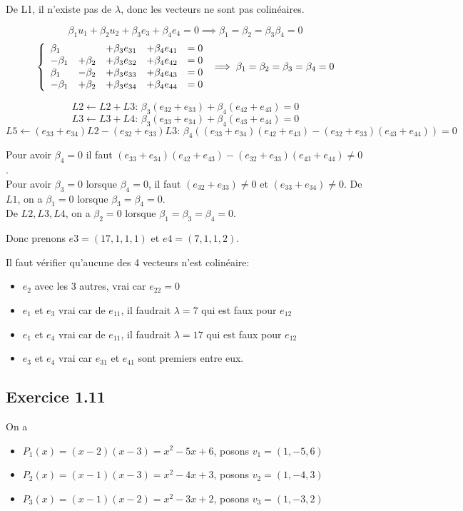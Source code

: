 \documentclass[]{book}
\theoremstyle{definition}
\begin{document}
De L1, il n'existe pas de $\lambda$, donc les vecteurs ne sont pas colin\'eaires.

$$
\beta_1 u_{1} +\beta_2 u_{2} + \beta_3 e_{3} + \beta_4 e_{4} = 0
\implies
\beta_1=\beta_2=\beta_3\beta_4=0
$$
$$
\left\{ 
\begin{array}{l l l l l}
  \beta_1  &          & +\beta_3 e_{31} & +\beta_4 e_{41} & = 0 \\
  -\beta_1 & +\beta_2 & +\beta_3 e_{32} & +\beta_4 e_{42} & = 0 \\
  \beta_1  & -\beta_2 & +\beta_3 e_{33} & +\beta_4 e_{43} & = 0 \\
  -\beta_1 & +\beta_2 & +\beta_3 e_{34} & +\beta_4 e_{44} & = 0 \\
\end{array}
\right. 
\implies
\beta_1=\beta_2=\beta_3=\beta_4=0
$$

$$L2 \leftarrow L2+L3:\, \beta_3(e_{32}+e_{33}) + \beta_4(e_{42}+e_{43}) = 0$$
$$L3 \leftarrow L3+L4:\, \beta_3(e_{33}+e_{34}) + \beta_4(e_{43}+e_{44}) = 0$$
$$L5 \leftarrow (e_{33}+e_{34})L2 - (e_{32}+e_{33})L3:\, \beta_4 ((e_{33}+e_{34})(e_{42}+e_{43}) - (e_{32}+e_{33})(e_{43}+e_{44})) = 0$$

Pour avoir $\beta_4 = 0$ il faut $(e_{33}+e_{34})(e_{42}+e_{43}) - (e_{32}+e_{33})(e_{43}+e_{44})\neq 0$.\\
Pour avoir $\beta_3 = 0$ lorsque $\beta_4 = 0$, il faut $(e_{32}+e_{33}) \neq 0$ et $(e_{33}+e_{34}) \neq 0$.
De $L1$, on a $\beta_1 = 0$ lorsque $\beta_3 = \beta_4 = 0$.\\
De $L2,L3,L4$, on a $\beta_2 = 0$ lorsque $\beta_1 = \beta_3 = \beta_4 = 0$.

Donc prenons $e3 = (17,1,1,1)$ et $e4=(7,1,1,2)$.

Il faut v\'erifier qu'aucune des 4 vecteurs n'est colin\'eaire: 
\begin{itemize}
\item $e_2$ avec les 3 autres, vrai car $e_{22} = 0$
\item $e_1$ et $e_3$ vrai car de $e_{11}$, il faudrait $\lambda=7$ qui est faux pour $e_{12}$
\item $e_1$ et $e_4$ vrai car de $e_{11}$, il faudrait $\lambda=17$ qui est faux pour $e_{12}$
\item $e_3$ et $e_4$ vrai car $e_{31}$ et $e_{41}$ sont premiers entre eux.
\end{itemize}

\subsection*{Exercice 1.11}
On a 
\begin{itemize}
\item $P_1(x) = (x-2)(x-3) = x^2 -5x + 6$, posons $v_1 = (1,-5,6)$
\item $P_2(x) = (x-1)(x-3) = x^2 -4x + 3$, posons $v_2 = (1,-4,3)$
\item $P_3(x) = (x-1)(x-2) = x^2 -3x + 2$, posons $v_3 = (1,-3,2)$
\end{itemize}
\end{document}
